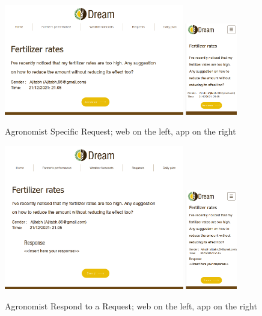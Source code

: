 \documentclass{article}
\begin{document}
        \begin{figure} [h]
            \centering
            \includegraphics[width=0.7\textwidth]{images/UserInterfaces/Agronomist/Requests/SpecificRequestWeb.png}
            \quad
            \includegraphics[width=0.2\textwidth]{images/UserInterfaces/Agronomist/Requests/SpecificRequestApp.png}
            \quad
            \caption{\label{fig:agronomistRequest}Agronomist Specific Request; web on the left, app on the right}
        \end{figure}
        \newpage
        \begin{figure} [h]
            \centering
            \includegraphics[width=0.7\textwidth]{images/UserInterfaces/Agronomist/Requests/RespondWeb.png}
            \quad
            \includegraphics[width=0.2\textwidth]{images/UserInterfaces/Agronomist/Requests/RespondApp.png}
            \quad
            \caption{\label{fig:agronomistRespond}Agronomist Respond to a Request; web on the left, app on the right}
        \end{figure}
\end{document}
